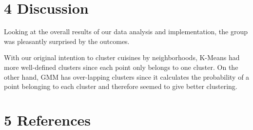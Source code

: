 \documentclass{neu_handout}
\begin{document}
\section*{4 Discussion}

Looking at the overall results of our data analysis and implementation, the group was pleasantly surprised by the outcomes.

With our original intention to cluster cuisines by neighborhoods, K-Means had more well-defined clusters since each point only belongs to one cluster. On the other hand, GMM has over-lapping clusters since it calculates the probability of a point belonging to each cluster and therefore seemed to give better clustering.


\section*{5 References}
\end{document}
